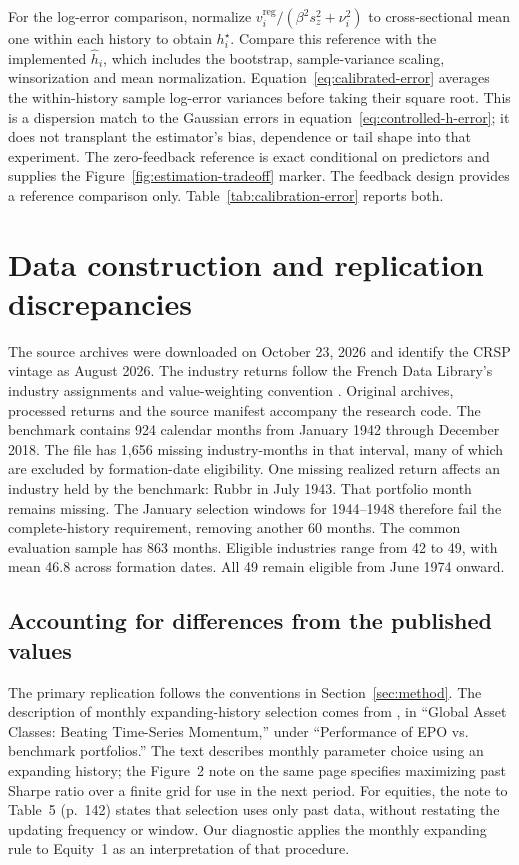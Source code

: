 For the log-error comparison, normalize $v_i^{\mathrm{reg}}/(\beta^2s_z^2+\nu_i^2)$ to cross-sectional mean one within each history to obtain $h_i^\star$. Compare this reference with the implemented $\widehat h_i$, which includes the bootstrap, sample-variance scaling, winsorization and mean normalization. Equation~\eqref{eq:calibrated-error} averages the within-history sample log-error variances before taking their square root. This is a dispersion match to the Gaussian errors in equation~\eqref{eq:controlled-h-error}; it does not transplant the estimator's bias, dependence or tail shape into that experiment. The zero-feedback reference is exact conditional on predictors and supplies the Figure~\ref{fig:estimation-tradeoff} marker. The feedback design provides a reference comparison only. Table~\ref{tab:calibration-error} reports both.

\FloatBarrier

\section{Data construction and replication discrepancies}
\label{app:data}
\setcounter{table}{0}\setcounter{figure}{0}
The source archives were downloaded on October 23, 2026 and identify the CRSP vintage as August 2026. The industry returns follow the French Data Library's industry assignments and value-weighting convention \citep{frenchdata}. Original archives, processed returns and the source manifest accompany the research code. The benchmark contains 924 calendar months from January 1942 through December 2018. The file has 1,656 missing industry-months in that interval, many of which are excluded by formation-date eligibility. One missing realized return affects an industry held by the benchmark: Rubbr in July 1943. That portfolio month remains missing. The January selection windows for 1944--1948 therefore fail the complete-history requirement, removing another 60 months. The common evaluation sample has 863 months. Eligible industries range from 42 to 49, with mean 46.8 across formation dates. All 49 remain eligible from June 1974 onward.

\subsection{Accounting for differences from the published values}
The primary replication follows the conventions in Section~\ref{sec:method}. The description of monthly expanding-history selection comes from \citet[p.~138]{pedersen2021}, in ``Global Asset Classes: Beating Time-Series Momentum,'' under ``Performance of EPO vs. benchmark portfolios.'' The text describes monthly parameter choice using an expanding history; the Figure~2 note on the same page specifies maximizing past Sharpe ratio over a finite grid for use in the next period. For equities, the note to Table~5 (p.~142) states that selection uses only past data, without restating the updating frequency or window. Our diagnostic applies the monthly expanding rule to Equity~1 as an interpretation of that procedure.

